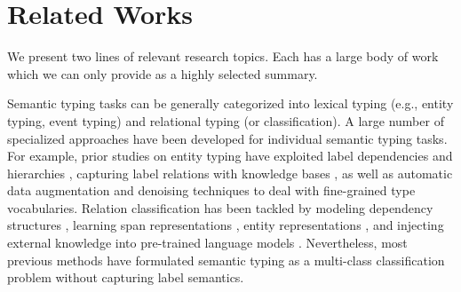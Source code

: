 \documentclass[11pt]{article}
\newcommand{\stitle}[1]{\vspace{1ex} \noindent{\bf #1}}
\begin{document}
\section{Related Works}

We present two lines of relevant research topics. Each has a large body of work which we can only provide as a highly selected summary.

\stitle{Semantic Typing.} Semantic typing tasks can be generally categorized into lexical typing (e.g., entity typing, event typing) and relational typing (or classification).  A large number of specialized approaches have been developed for individual semantic typing tasks. For example, prior studies on entity typing have exploited label dependencies and hierarchies \cite{xu-barbosa-2018-neural,xiong-etal-2019-imposing}, capturing label relations with knowledge bases \cite{dai-etal-2019-improving,jin-etal-2019-fine}, as well as automatic data augmentation and denoising techniques \cite{onoe-durrett-2019-learning,dai-etal-2021-ultra} to deal with fine-grained type vocabularies. Relation classification has been tackled by modeling dependency structures \cite{zhang-etal-2018-graph}, learning span representations \cite{joshi-etal-2020-spanbert}, entity representations \cite{yamada-etal-2020-luke}, and injecting external knowledge into pre-trained language models  \cite{peters-etal-2019-knowledge, zhang-etal-2019-ernie, wang-etal-2021-k}. Nevertheless, most previous methods have formulated semantic typing as a multi-class classification problem without capturing label semantics.
\end{document}
